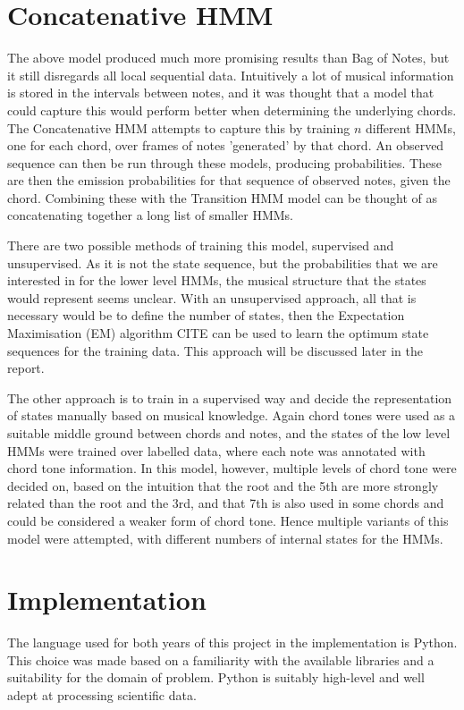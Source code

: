\documentclass[bsc,logo,twoside,singlespacing,parskip,deptreport]{infthesis}
\begin{document}
\section{Concatenative HMM}

The above model produced much more promising results than Bag of Notes, but it still disregards all local sequential data. Intuitively a lot of musical information is stored in the intervals between notes, and it was thought that a model that could capture this would perform better when determining the underlying chords. The Concatenative HMM attempts to capture this by training $n$ different HMMs, one for each chord, over frames of notes 'generated' by that chord. An observed sequence can then be run through these models, producing probabilities. These are then the emission probabilities for that sequence of observed notes, given the chord. Combining these with the Transition HMM model can be thought of as concatenating together a long list of smaller HMMs. 

There are two possible methods of training this model, supervised and unsupervised. As it is not the state sequence, but the probabilities that we are interested in for the lower level HMMs, the musical structure that the states would represent seems unclear. With an unsupervised approach, all that is necessary would be to define the number of states, then the Expectation Maximisation (EM) algorithm CITE can be used to learn the optimum state sequences for the training data. This approach will be discussed later in the report.

The other approach is to train in a supervised way and decide the representation of states manually based on musical knowledge. Again chord tones were used as a suitable middle ground between chords and notes, and the states of the low level HMMs were trained over labelled data, where each  note was annotated with chord tone information. In this model, however, multiple levels of chord tone were decided on, based on the intuition that the root and the 5th are more strongly related than the root and the 3rd, and that 7th is also used in some chords and could be considered a weaker form of chord tone. Hence multiple variants of this model were attempted, with different numbers of internal states for the HMMs.

\section{Implementation}

The language used for both years of this project in the implementation is Python. This choice was made based on a familiarity with the available libraries and a suitability for the domain of problem. Python is suitably high-level and well adept at processing scientific data.
\end{document}
